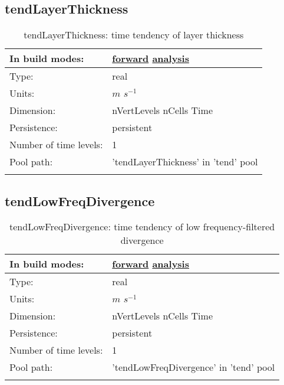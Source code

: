 \subsection[tendLayerThickness]{tendLayerThickness}
\label{subsec:var_sec_tend_tendLayerThickness}
\begin{center}
\begin{longtable}{| p{2.0in} | p{4.0in} |}
        \hline 
        In build modes: & \hyperref[subsec:forward_var_tab_tend]{forward} \hyperref[subsec:analysis_var_tab_tend]{analysis} \\
        \hline 
        Type: & real \\
        \hline 
        Units: & $m$ $s^{-1}$ \\
        \hline 
        Dimension: & nVertLevels nCells Time \\
        \hline 
        Persistence: & persistent \\
        \hline 
        Number of time levels: & 1 \\
        \hline 
            Pool path: & 'tendLayerThickness' in 'tend' pool
 \\
		 \hline 
    \caption{tendLayerThickness: time tendency of layer thickness}
\end{longtable}
\end{center}
\subsection[tendLowFreqDivergence]{tendLowFreqDivergence}
\label{subsec:var_sec_tend_tendLowFreqDivergence}
\begin{center}
\begin{longtable}{| p{2.0in} | p{4.0in} |}
        \hline 
        In build modes: & \hyperref[subsec:forward_var_tab_tend]{forward} \hyperref[subsec:analysis_var_tab_tend]{analysis} \\
        \hline 
        Type: & real \\
        \hline 
        Units: & $m$ $s^{-1}$ \\
        \hline 
        Dimension: & nVertLevels nCells Time \\
        \hline 
        Persistence: & persistent \\
        \hline 
        Number of time levels: & 1 \\
        \hline 
            Pool path: & 'tendLowFreqDivergence' in 'tend' pool
 \\
		 \hline 
    \caption{tendLowFreqDivergence: time tendency of low frequency-filtered divergence}
\end{longtable}
\end{center}
